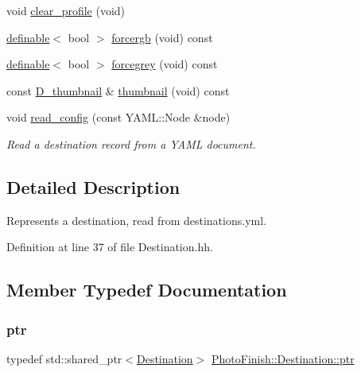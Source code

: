 \begin{DoxyCompactItemize}
\item 
void \hyperlink{class_photo_finish_1_1_destination_a0981df4a77c78a0271c1ee3a7d155a56}{clear\+\_\+profile} (void)
\item 
\hyperlink{class_photo_finish_1_1definable}{definable}$<$ bool $>$ \hyperlink{class_photo_finish_1_1_destination_a6a66e2c4a6009ae787dbabf0cca5f724}{forcergb} (void) const
\item 
\hyperlink{class_photo_finish_1_1definable}{definable}$<$ bool $>$ \hyperlink{class_photo_finish_1_1_destination_a8898f99d52ebd9d25c1b0f7662147a28}{forcegrey} (void) const
\item 
const \hyperlink{class_photo_finish_1_1_d__thumbnail}{D\+\_\+thumbnail} \& \hyperlink{class_photo_finish_1_1_destination_a085dbe26aade0eda5d6a889162ed7880}{thumbnail} (void) const
\item 
void \hyperlink{class_photo_finish_1_1_destination_aa841d37db33acf0b9b860d819a977267}{read\+\_\+config} (const Y\+A\+M\+L\+::\+Node \&node)
\begin{DoxyCompactList}\small\item\em Read a destination record from a Y\+A\+ML document. \end{DoxyCompactList}\end{DoxyCompactItemize}


\subsection{Detailed Description}
Represents a destination, read from destinations.\+yml. 

Definition at line 37 of file Destination.\+hh.



\subsection{Member Typedef Documentation}
\mbox{\label{class_photo_finish_1_1_destination_a0d282a905cd81c3f0e6d7233c9bc7774}} 
\subsubsection{\texorpdfstring{ptr}{ptr}}
{\footnotesize\ttfamily typedef std\+::shared\+\_\+ptr$<$\hyperlink{class_photo_finish_1_1_destination}{Destination}$>$ \hyperlink{class_photo_finish_1_1_destination_a0d282a905cd81c3f0e6d7233c9bc7774}{Photo\+Finish\+::\+Destination\+::ptr}}



